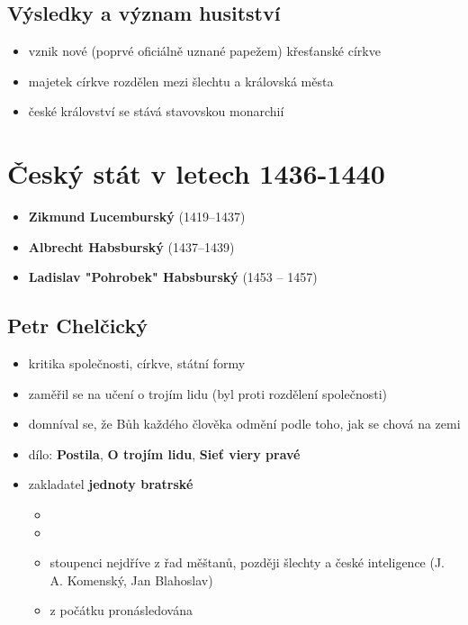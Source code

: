 \subsection{Výsledky a význam husitství}
\begin{itemize}
\item vznik nové (poprvé oficiálně uznané papežem) křesťanské církve
\item majetek církve rozdělen mezi šlechtu a královská města
\item české království se stává stavovskou monarchií
\end{itemize}



\section{Český stát v letech 1436-1440}
\begin{itemize}
\item \textbf{Zikmund Lucemburský} (1419--1437)
\item \textbf{Albrecht Habsburský} (1437--1439)
\item \textbf{Ladislav "Pohrobek" Habsburský} (1453 -- 1457)
\end{itemize}

\subsection{Petr Chelčický}
\begin{itemize}
\item kritika společnosti, církve, státní formy
\item zaměřil se na učení o trojím lidu (byl proti rozdělení společnosti)
\item domníval se, že Bůh každého člověka odmění podle toho, jak se chová na zemi
\item dílo: \textbf{Postila}, \textbf{O trojím lidu}, \textbf{Sieť viery pravé}
\item zakladatel \textbf{jednoty bratrské}
	\begin{itemize}
	\item {}
	\item {}
	\item stoupenci nejdříve z řad měštanů, později šlechty a české inteligence (J. A. Komenský, Jan Blahoslav)
	\item z počátku pronásledována
	\end{itemize}
\end{itemize}



